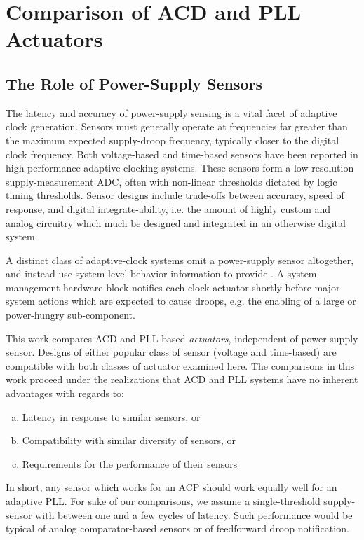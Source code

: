 \documentclass[twoside,9pt,journal,letterpage]{IEEEtran}
\begin{document}
\section{Comparison of ACD and PLL Actuators}
\label{sec:comparison}

\subsection{The Role of Power-Supply Sensors}

The latency and accuracy of power-supply sensing is a vital facet of adaptive clock generation. Sensors must generally operate at frequencies far greater than the maximum expected supply-droop frequency, typically closer to the digital clock frequency. Both voltage-based and time-based sensors have been reported in high-performance adaptive clocking systems. These sensors form a low-resolution supply-measurement ADC, often with non-linear thresholds dictated by logic timing thresholds. Sensor designs include trade-offs between accuracy, speed of response, and digital integrate-ability, i.e. the amount of highly custom and analog circuitry which much be designed and integrated in an otherwise digital system. 

A distinct class of adaptive-clock systems omit a power-supply sensor altogether, and instead use system-level behavior information to provide . A system-management hardware block notifies each clock-actuator shortly before major system actions which are expected to cause droops, e.g. the enabling of a large or power-hungry sub-component. 

This work compares ACD and PLL-based \textit{actuators}, independent of power-supply sensor. Designs of either popular class of sensor (voltage and time-based) are compatible with both classes of actuator examined here. The comparisons in this work proceed under the realizations that ACD and PLL systems have no inherent advantages with regards to:

\begin{enumerate}[(a)]
\item Latency in response to similar sensors, or
\item Compatibility with similar diversity of sensors, or
\item Requirements for the performance of their sensors
\end{enumerate}

In short, any sensor which works for an ACP should work equally well for an adaptive PLL. For sake of our comparisons, we assume a single-threshold supply-sensor with between one and a few cycles of latency. Such performance would be typical of analog comparator-based sensors or of feedforward droop notification. 
\end{document}
